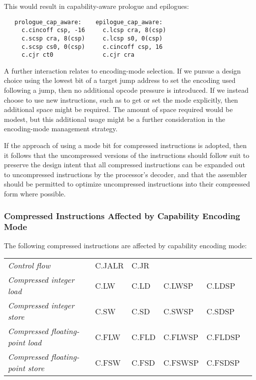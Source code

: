 This would result in capability-aware prologue and epilogues:

\begin{small}
\begin{verbatim}
   prologue_cap_aware:    epilogue_cap_aware:
     c.cincoff csp, -16     c.lcsp cra, 8(csp)
     c.scsp cra, 8(csp)     c.lcsp s0, 0(csp)
     c.scsp cs0, 0(csp)     c.cincoff csp, 16
     c.cjr ct0              c.cjr cra
\end{verbatim}
\end{small}

A further interaction relates to encoding-mode selection.
If we pursue a design choice using the lowest bit of a target jump address to
set the encoding used following a jump, then no additional opcode pressure is
introduced.
If we instead choose to use new instructions, such as to get or set the mode
explicitly, then additional space might be required.
The amount of space required would be modest, but this additional usage might
be a further consideration in the encoding-mode management strategy.

If the approach of using a mode bit for compressed instructions is
adopted, then it follows that the uncompressed versions of the
instructions should follow suit to preserve the design intent that
all compressed instructions can be expanded out to uncompressed
instructions by the processor's decoder, and that the assembler should
be permitted to optimize uncompressed instructions into their
compressed form where possible.

\subsubsection{Compressed Instructions Affected by Capability Encoding Mode}

The following compressed instructions are affected by capability encoding
mode:

\medskip

\begin{tabular}{llllll}
\textit{Control flow} & C.JALR & C.JR & & \\
\textit{Compressed integer load} & C.LW & C.LD & C.LWSP & C.LDSP & \\
\textit{Compressed integer store} & C.SW & C.SD & C.SWSP & C.SDSP & \\
\textit{Compressed floating-point load} & C.FLW & C.FLD & C.FLWSP & C.FLDSP & \\
\textit{Compressed floating-point store} & C.FSW & C.FSD & C.FSWSP & C.FSDSP & \\
\end{tabular}

